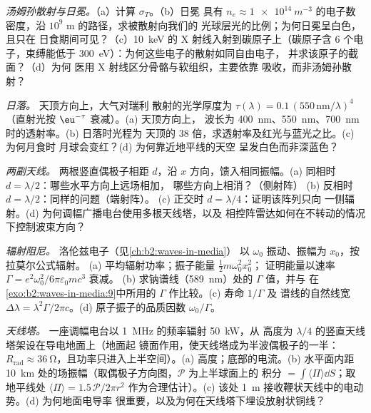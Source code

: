 \begin{exercise}[$\star\star$]\label{exo:b2:dipole-radiation:7}
\emph{汤姆孙散射与日冕。}（a）计算 $\sigma_T$。（b）日冕
具有 $n_e \approx \qty{1e14}{m^{-3}}$ 的电子数密度，沿 $10^9$ m 的路径，求被散射向我们的
光球层光的比例；为何日冕呈白色，且只在
日食期间可见？（c）\qty{10}{keV} 的 X 射线入射到碳原子上（碳原子含 $6$
个电子，束缚能低于 \qty{300}{eV}）：为何这些电子的散射如同自由电子，
并求该原子的截面？（d）为何
医用 X 射线区分骨骼与软组织，主要依靠
吸收，而非汤姆孙散射？
\end{exercise}

\begin{exercise}[$\star\star$]\label{exo:b2:dipole-radiation:8}
\emph{日落。} 天顶方向上，大气对瑞利
散射的光学厚度为 $\tau(\lambda) = 0.1\,(550\,\text{nm}/\lambda)^4$（直射光按
$\eu^{-\tau}$ 衰减）。(a) 天顶方向上，
波长为 \qty{400}{nm}、\qty{550}{nm}、\qty{700}{nm} 时的透射率。(b) 日落时光程为
天顶的 $38$ 倍，求透射率及红光与蓝光之比。(c) 为何月食时
月球会变红？(d) 为何靠近地平线的天空
呈发白色而非深蓝色？
\end{exercise}

\begin{exercise}[$\star\star$]\label{exo:b2:dipole-radiation:9}
\emph{两副天线。} 两根竖直偶极子相距 $d$，沿
$x$ 方向，馈入相同振幅。(a) 同相时 $d = \lambda/2$：哪些水平方向上远场相加，
哪些方向上相消？（侧射阵）
(b) 反相时 $d = \lambda/2$：同样的问题（端射阵）。
(c) 正交时 $d = \lambda/4$：证明该阵列只向
一侧辐射。(d) 为何调幅广播电台使用多根天线塔，以及
相控阵雷达如何在不转动的情况下控制波束方向？
\end{exercise}

\begin{exercise}[$\star\star\star$]\label{exo:b2:dipole-radiation:10}
\emph{辐射阻尼。} 洛伦兹电子（见\cref{ch:b2:waves-in-media}）
以 $\omega_0$ 振动、振幅为 $x_0$，按拉莫尔公式辐射。
(a) 平均辐射功率；振子能量 $\tfrac12m\omega_0^2x_0^2$；
证明能量以速率 $\Gamma = e^2\omega_0^2/6\pi\varepsilon_0mc^3$ 衰减。
(b) 求钠谱线（\qty{589}{nm}）处的 $\Gamma$ 值，并与
在\cref{exo:b2:waves-in-media:9}中所用的 $\Gamma$ 作比较。(c) 寿命 $1/\Gamma$ 及
谱线的自然线宽 $\Delta\lambda = \lambda^2\Gamma/2\pi c$。(d) 原子振子的品质因数
$\omega_0/\Gamma$。
\end{exercise}

\begin{exercise}[$\star\star\star$]\label{exo:b2:dipole-radiation:11}
\emph{天线塔。} 一座调幅电台以 \qty{1}{MHz} 的频率辐射 \qty{50}{kW}，从
高度为 $\lambda/4$ 的竖直天线塔架设在导电地面上（地面起
镜面作用，使天线塔成为半波偶极子的一半：$R_{\text{rad}} \approx
\qty{36}{\ohm}$，且功率只进入上半空间）。(a)
高度；底部的电流。(b) 水平面内距
\qty{10}{km} 处的场振幅（取偶极子方向图，$\mathcal P$ 为上半球面上的
积分 $= \int\langle\Pi\rangle\dd S$；取地平线处 $\langle\Pi\rangle = 1.5\,
\mathcal P/2\pi r^2$ 作为合理估计）。(c)
该处 \qty{1}{m} 接收鞭状天线中的电动势。(d) 为何地面电导率
很重要，以及为何在天线塔下埋设放射状铜线？
\end{exercise}

